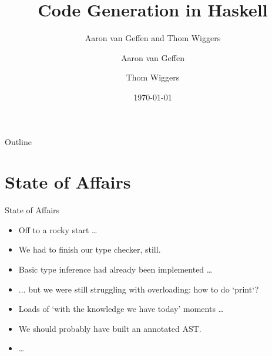 \documentclass[department=icis, slidenumbers=slide, official=true]{beamerruhuisstijl}
\title{Code Generation in Haskell}
\subtitle{Aaron van Geffen and Thom Wiggers}
\date{\today}
\author{Aaron van Geffen \and Thom Wiggers}
\begin{document}
\begin{frame}
    \titlepage{}
\end{frame}











\begin{frame}{Outline}
    \tableofcontents
\end{frame}


\section{State of Affairs}
\begin{frame}{State of Affairs} %
    \pause
    \begin{itemize}[<+->]
        \item Off to a rocky start \ldots
        \item We had to finish our type checker, still.
            \vspace{1em}

        \item Basic type inference had already been implemented \ldots
        \item ... but we were still struggling with overloading: how to do `print`?
            \vspace{1em}

        \item Loads of `with the knowledge we have today' moments \ldots
        \item We should probably have built an annotated AST.
            \vspace{1em}

        \item \ldots
    \end{itemize}
\end{frame}
\end{document}
